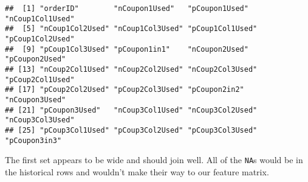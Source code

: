 \documentclass[10pt]{report}
\newenvironment{Shaded}{}{}
\newcommand{\DecValTok}[1]{\textcolor[rgb]{0.25,0.63,0.44}{{#1}}}
\newcommand{\StringTok}[1]{\textcolor[rgb]{0.25,0.44,0.63}{{#1}}}
\newcommand{\NormalTok}[1]{{#1}}
\begin{document}
\begin{Shaded}
\end{Shaded}

\begin{verbatim}
##  [1] "orderID"        "nCoupon1Used"   "pCoupon1Used"   "nCoup1Col1Used"
##  [5] "nCoup1Col2Used" "nCoup1Col3Used" "pCoup1Col1Used" "pCoup1Col2Used"
##  [9] "pCoup1Col3Used" "pCoupon1in1"    "nCoupon2Used"   "pCoupon2Used"  
## [13] "nCoup2Col1Used" "nCoup2Col2Used" "nCoup2Col3Used" "pCoup2Col1Used"
## [17] "pCoup2Col2Used" "pCoup2Col3Used" "pCoupon2in2"    "nCoupon3Used"  
## [21] "pCoupon3Used"   "nCoup3Col1Used" "nCoup3Col2Used" "nCoup3Col3Used"
## [25] "pCoup3Col1Used" "pCoup3Col2Used" "pCoup3Col3Used" "pCoupon3in3"
\end{verbatim}

The first set appears to be wide and should join well. All of the
\verb!NA!s would be in the historical rows and wouldn't make their way
to our feature matrix.

\begin{Shaded}
\end{Shaded}
\end{document}
